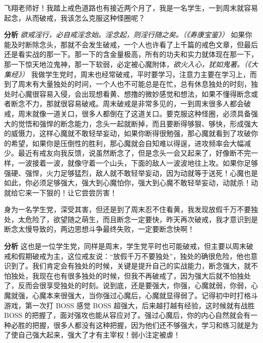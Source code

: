 \begin{case}[做好慎独]
    飞翔老师好！我踏上戒色道路也有接近两个月了，我是一名学生，一到周末就容易起念，从而破戒，我该怎么克服这种怪圈呢？

    \textbf{分析} \textit{欲戒淫行，必自戒淫念始。淫念起，则淫行随之矣。（《寿康宝鉴》）} 如果你能及时断除念头，那就不会发生破戒，一个人也许看了上千篇的戒色文章，但最后还是看实战的那一下。那一下的含金量极高，所有的功夫和实力就体现在那一下，那一下惊天地泣鬼神，那一下软弱，必定被心魔附体，\textit{欲火入心，犹如鬼著。（《大集经》）} 我做学生党时，周末也经常破戒，平时要学习，注意力主要在学习上，而到了周末有大量独处的时间，一个人也不可能总是在忙，总有休息独处的时刻，独处时心魔很容易入侵，会出现想看黄、想撸的微妙感觉和想法，如果不懂得断念或者断念不力，那就很容易破戒。周末破戒是非常多见的，一到周末很多人都会破戒，周末就像一道关口，很多人都倒在了这道关口。要克服这种怪圈，必须具备强大的觉悟和强悍的断念能力，念头一起就断掉，而且要断得够狠、够快，形成强大的威慑力，这样心魔就不敢轻举妄动，如果你断得很勉强，那心魔就看到了攻破你的希望，如果你是压倒性的胜利，那心魔就会自知难以得逞，进攻频率会大幅减少。最近有戒友向我反馈，说虽然断念了，但是念头一会又起来了，好像断不完一样，一波接着一波，就像守着一个山头，下面的敌人一波波地往上攻。如果你足够强硬、强悍，火力足够猛烈，敌人就不敢轻举妄动，因为动就等于送死！心魔也是如此，你必须足够强大，强大到心魔怕你，强大到心魔不敢轻举妄动，动就杀！动就给它来一下狠的！让它尝尝厉害！
\end{case}

\begin{case}[做好慎独]
    身为一名学生党，深受其害，但还是到了周末忍不住看黄，我发现放假千万不要独处，太危险了，欲望随之萌生，而且断念一定要快，昨天再次破戒，我才意识到是断念太慢导致的，两边思想斗争最终失败，一定要断念快啊！

    \textbf{分析} 这也是一位学生党，同样是周末，学生党平时也可能破戒，但主要以周末破戒和假期破戒为主，这位戒友说：“放假千万不要独处”，独处的确很危险，他也意识到了。我们肯定会有独处的时候，关键是提升自己的实战能力，断念强大，就不怕独处，我现在也有很多独处的时候，但我不再破戒了，因为强大后就不怕独处了，反而会很享受独处的时刻。说到底，还是要强大，你强，心魔就弱，你弱，心魔就强，心魔本来很强大，当你强过心魔后，心魔就显得弱了。记得初中时打格斗游戏，第一次打 BOSS 感觉 BOSS 超强大，后来越打越有经验，这时候就有战胜 BOSS 的把握了，面对强攻也能从容应对了。强过心魔后，你的内心自然就会有一种必胜的把握，很多人都没有这种把握，因为他们还不够强大，学习和练习就是为了使自己强大起来，强大了才有主宰权！弱小注定被虐！
\end{case}

